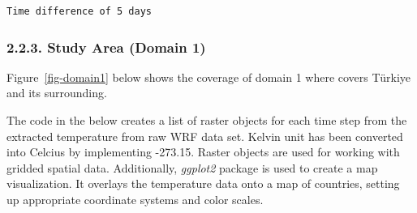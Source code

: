 \documentclass[
  letterpaper,
  DIV=11,
  numbers=noendperiod,
  abstract]{scrartcl}
\begin{document}
\begin{verbatim}
Time difference of 5 days
\end{verbatim}

\hypertarget{study-area-domain-1}{%
\subsubsection{2.2.3. Study Area (Domain 1)}\label{study-area-domain-1}}

Figure~\ref{fig-domain1} below shows the coverage of domain 1 where
covers Türkiye and its surrounding.

The code in the below creates a list of raster objects for each time
step from the extracted temperature from raw WRF data set. Kelvin unit
has been converted into Celcius by implementing -273.15. Raster objects
are used for working with gridded spatial data. Additionally,
\emph{ggplot2} package is used to create a map visualization. It
overlays the temperature data onto a map of countries, setting up
appropriate coordinate systems and color scales.
\end{document}
